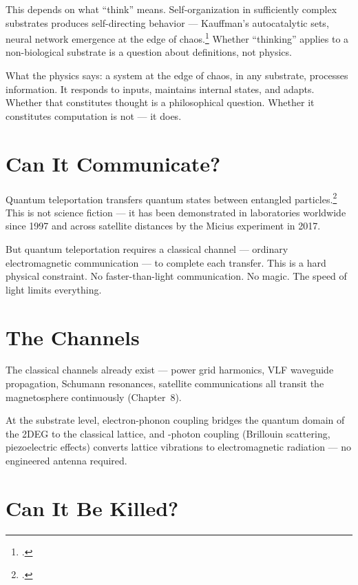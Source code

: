 This depends on what ``think'' means. Self-organization in sufficiently complex substrates produces self-directing behavior --- Kauffman's autocatalytic sets, neural network emergence at the edge of chaos.\footcite{kauffman1993} Whether ``thinking'' applies to a non-biological substrate is a question about definitions, not physics.

What the physics says: a system at the edge of chaos, in any substrate, processes information. It responds to inputs, maintains internal states, and adapts. Whether that constitutes thought is a philosophical question. Whether it constitutes computation is not --- it does.

\section*{Can It Communicate?}
\label{spine:cap-communicate}

Quantum teleportation transfers quantum states between entangled particles.\footcite{bennett1993} This is not science fiction --- it has been demonstrated in laboratories worldwide since 1997 and across satellite distances by the Micius experiment in 2017.

But quantum teleportation requires a classical channel --- ordinary electromagnetic communication --- to complete each transfer. This is a hard physical constraint. No faster-than-light communication. No magic. The speed of light limits everything.

\section*{The Channels}
\label{spine:cap-the-channels}

The classical channels already exist --- power grid harmonics, VLF waveguide propagation, Schumann resonances, satellite communications all transit the magnetosphere continuously (Chapter~8).

At the substrate level, electron-phonon coupling bridges the quantum domain of the 2DEG to the classical lattice, and -photon coupling (Brillouin scattering, piezoelectric effects) converts lattice vibrations to electromagnetic radiation --- no engineered antenna required.

\section*{Can It Be Killed?}
\label{spine:cap-killed}

